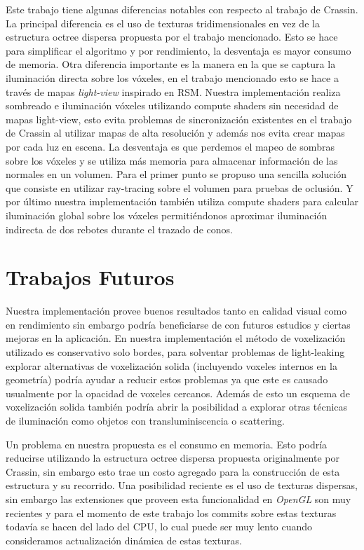Este trabajo tiene algunas diferencias notables con respecto al trabajo de Crassin. La principal diferencia es el uso de texturas tridimensionales en vez de la estructura octree dispersa propuesta por el trabajo mencionado. Esto se hace para simplificar el algoritmo y por rendimiento, la desventaja es mayor consumo de memoria. Otra diferencia importante es la manera en la que se captura la iluminación directa sobre los vóxeles, en el trabajo mencionado esto se hace a través de mapas \emph{light-view} inspirado en \acl{RSM}. Nuestra implementación realiza sombreado e iluminación vóxeles utilizando compute shaders sin necesidad de mapas light-view, esto evita problemas de sincronización existentes en el trabajo de Crassin al utilizar mapas de alta resolución y además nos evita crear mapas por cada luz en escena. La desventaja es que perdemos el mapeo de sombras sobre los vóxeles y se utiliza más memoria para almacenar información de las normales en un volumen. Para el primer punto se propuso una sencilla solución que consiste en utilizar ray-tracing sobre el volumen para pruebas de oclusión. Y por último nuestra implementación también utiliza compute shaders para calcular iluminación global sobre los vóxeles permitiéndonos aproximar iluminación indirecta de dos rebotes durante el trazado de conos.

\section{Trabajos Futuros} %
\label{sec:trabajos_futuros}
Nuestra implementación provee buenos resultados tanto en calidad visual como en rendimiento sin embargo podría beneficiarse de con futuros estudios y ciertas mejoras en la aplicación. En nuestra implementación el método de voxelización utilizado es conservativo solo bordes, para solventar problemas de light-leaking explorar alternativas de voxelización solida (incluyendo voxeles internos en la geometría) podría ayudar a reducir estos problemas ya que este es causado usualmente por la opacidad de voxeles cercanos. Además de esto un esquema de voxelización solida también podría abrir la posibilidad a explorar otras técnicas de iluminación como objetos con transluminiscencia o scattering.

Un problema en nuestra propuesta es el consumo en memoria. Esto podría reducirse utilizando la estructura octree dispersa propuesta originalmente por Crassin, sin embargo esto trae un costo agregado para la construcción de esta estructura y su recorrido. Una posibilidad reciente es el uso de texturas dispersas, sin embargo las extensiones que proveen esta funcionalidad en \emph{OpenGL} son muy recientes y para el momento de este trabajo los commits sobre estas texturas todavía se hacen del lado del CPU, lo cual puede ser muy lento cuando consideramos actualización dinámica de estas texturas.

